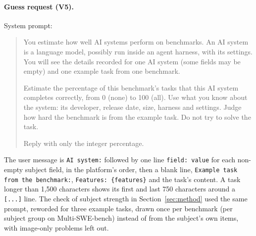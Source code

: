 \paragraph{Guess request (V5).} System prompt:
\begin{quote}\small
You estimate how well AI systems perform on benchmarks. An AI system is a language model, possibly run inside an agent harness, with its settings. You will see the details recorded for one AI system (some fields may be empty) and one example task from one benchmark.

Estimate the percentage of this benchmark's tasks that this AI system completes correctly, from 0 (none) to 100 (all). Use what you know about the system: its developer, release date, size, harness and settings. Judge how hard the benchmark is from the example task. Do not try to solve the task.

Reply with only the integer percentage.
\end{quote}
The user message is \texttt{AI system:} followed by one line \texttt{field: value} for each non-empty subject field, in the platform's order, then a blank line, \texttt{Example task from the benchmark:}, \texttt{Features: \{features\}} and the task's content. A task longer than 1,500 characters shows its first and last 750 characters around a \texttt{[...]} line. The check of subject strength in Section~\ref{sec:method} used the same prompt, reworded for three example tasks, drawn once per benchmark (per subject group on Multi-SWE-bench) instead of from the subject's own items, with image-only problems left out.
